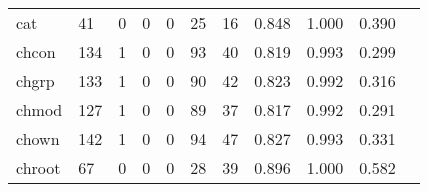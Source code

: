\begin{longtable}{lp{1.20cm}p{1.20cm}p{1.20cm}p{1.20cm}p{1.20cm}p{1.20cm}p{1.20cm}p{1.20cm}p{1.20cm}p{1.20cm}}
cat       &                                    41 &                                                  0 &                                                  0 &                                                  0 &                                                 25 &                                                 16 &                                         0.848 &                                              1.000 &                                              0.390 \\
chcon     &                                   134 &                                                  1 &                                                  0 &                                                  0 &                                                 93 &                                                 40 &                                         0.819 &                                              0.993 &                                              0.299 \\
chgrp     &                                   133 &                                                  1 &                                                  0 &                                                  0 &                                                 90 &                                                 42 &                                         0.823 &                                              0.992 &                                              0.316 \\
chmod     &                                   127 &                                                  1 &                                                  0 &                                                  0 &                                                 89 &                                                 37 &                                         0.817 &                                              0.992 &                                              0.291 \\
chown     &                                   142 &                                                  1 &                                                  0 &                                                  0 &                                                 94 &                                                 47 &                                         0.827 &                                              0.993 &                                              0.331 \\
chroot    &                                    67 &                                                  0 &                                                  0 &                                                  0 &                                                 28 &                                                 39 &                                         0.896 &                                              1.000 &                                              0.582 \\

\end{longtable}
